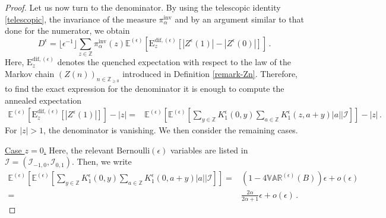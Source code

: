\documentclass[10pt,a4paper]{amsart}
\renewcommand{\geq}{\geqslant}
\begin{document}
\begin{proof}
\bigskip 
Let us now turn to the denominator. 
		By using the telescopic identity \eqref{telescopic}, the invariance of the measure $\pi^{\text{inv}}_{\alpha}$ and by an argument similar to that done for the numerator, we obtain 
	\begin{equation}\label{denominator-approximation}
		D^{\epsilon}=\lfloor\epsilon^{-1}\rfloor
		\sum_{z\in \mathbb{Z}}\pi^{\text{inv}}_{\alpha}(z)\mathbb{E}^{(\epsilon)}\left[\mathrm{E}_{z}^{\text{dif},(\epsilon)}\left[|Z^{\epsilon}(1)|-|Z^{\epsilon}(0)|\right]\right]\,.
	\end{equation}
	Here, $\mathrm{E}_{z}^{\text{dif},(\epsilon)}$ denotes the quenched expectation with respect to the law of the Markov chain $(Z(n))_{n\in \mathbb{Z}_{\geq 0}}$ introduced in Definition \ref{remark-Zn}. Therefore, to find the exact expression for the denominator it is enough to compute the annealed expectation
	\begin{equation*}
		\begin{split}
			\mathbb{E}^{(\epsilon)}\left[\mathrm{E}_{z}^{\text{dif},(\epsilon)}\left[|Z^{\epsilon}(1)|\right]\right]-|z|=&\mathbb{E}^{(\epsilon)}\left[\mathbb{E}^{(\epsilon)}\left[\sum_{y\in \mathbb{Z}}K_{1}^{\epsilon}(0,y)\sum_{a\in \mathbb{Z}}K_{1}^{\epsilon}(z,a+y)|a|
			\bigg| \bm{\mathcal{I}}\right]\right]-|z|\,.
		\end{split}
	\end{equation*}
	For $|z|>1$, the denominator is vanishing. We then consider the remaining cases.
\item{\underline{Case $z=0$.}}  Here, the relevant $\text{Bernoulli}(\epsilon)$ variables are listed in $\bm{\mathcal{I}}=(\mathcal{I}_{-1,0},\mathcal{I}_{0,1})$. Then, we write
	\begin{equation*}
		\begin{split}
			\mathbb{E}^{(\epsilon)}\left[\mathbb{E}^{(\epsilon)}\left[\sum_{y\in \mathbb{Z}}K_{1}^{\epsilon}(0,y)\sum_{a\in \mathbb{Z}}K_{1}^{\epsilon}(0,a+y)|a|\bigg| \mathcal{I}\right]\right]=&
			\left(1-4\mathbb{VAR}^{(\epsilon)}(B)\right)\epsilon+o(\epsilon)
			\\=&
			\frac{2\alpha}{2\alpha+1}\epsilon+o(\epsilon)\,.
		\end{split}
	\end{equation*}
	

\end{proof}
\end{document}

